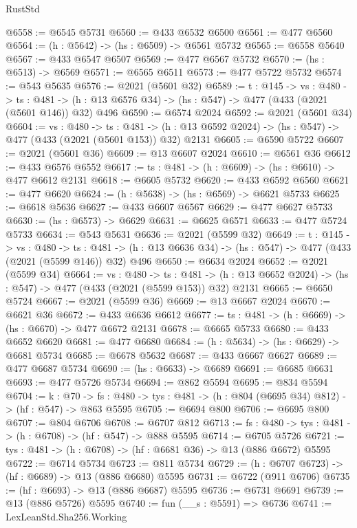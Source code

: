 \begin{lexlean}{RustStd}
\begin{coremodule}
@6558 := @6545 @5731
@6560 := @433 @6532 @6500
@6561 := @477 @6560
@6564 := (h : @5642) -> (hs : @6509) -> @6561 @5732
@6565 := @6558 @5640
@6567 := @433 @6547 @6507
@6569 := @477 @6567 @5732
@6570 := (hs : @6513) -> @6569
@6571 := @6565 @6511
@6573 := @477 @5722 @5732
@6574 := @543 @5635
@6576 := @2021 (@5601 @32)
@6589 := {t : @145} ->
  {vs : @480} ->
  {ts : @481} -> (h : @13 @6576 @34) -> (hs : @547) -> @477 (@433 (@2021 (@5601 @146)) @32) @496
@6590 := @6574 @2024
@6592 := @2021 (@5601 @34)
@6604 := {vs : @480} ->
  {ts : @481} -> (h : @13 @6592 @2024) -> (hs : @547) -> @477 (@433 (@2021 (@5601 @153)) @32) @2131
@6605 := @6590 @5722
@6607 := @2021 (@5601 @36)
@6609 := @13 @6607 @2024
@6610 := @6561 @36
@6612 := @433 @6576 @6552
@6617 := {ts : @481} -> (h : @6609) -> (hs : @6610) -> @477 @6612 @2131
@6618 := @6605 @5732
@6620 := @433 @6592 @6560
@6621 := @477 @6620
@6624 := (h : @5638) -> (hs : @6569) -> @6621 @5733
@6625 := @6618 @5636
@6627 := @433 @6607 @6567
@6629 := @477 @6627 @5733
@6630 := (hs : @6573) -> @6629
@6631 := @6625 @6571
@6633 := @477 @5724 @5733
@6634 := @543 @5631
@6636 := @2021 (@5599 @32)
@6649 := {t : @145} ->
  {vs : @480} ->
  {ts : @481} -> (h : @13 @6636 @34) -> (hs : @547) -> @477 (@433 (@2021 (@5599 @146)) @32) @496
@6650 := @6634 @2024
@6652 := @2021 (@5599 @34)
@6664 := {vs : @480} ->
  {ts : @481} -> (h : @13 @6652 @2024) -> (hs : @547) -> @477 (@433 (@2021 (@5599 @153)) @32) @2131
@6665 := @6650 @5724
@6667 := @2021 (@5599 @36)
@6669 := @13 @6667 @2024
@6670 := @6621 @36
@6672 := @433 @6636 @6612
@6677 := {ts : @481} -> (h : @6669) -> (hs : @6670) -> @477 @6672 @2131
@6678 := @6665 @5733
@6680 := @433 @6652 @6620
@6681 := @477 @6680
@6684 := (h : @5634) -> (hs : @6629) -> @6681 @5734
@6685 := @6678 @5632
@6687 := @433 @6667 @6627
@6689 := @477 @6687 @5734
@6690 := (hs : @6633) -> @6689
@6691 := @6685 @6631
@6693 := @477 @5726 @5734
@6694 := @862 @5594
@6695 := @834 @5594
@6704 := {k : @70} ->
  {fs : @480} -> {tys : @481} -> (h : @804 (@6695 @34) @812) -> (hf : @547) -> @863 @5595
@6705 := @6694 @800
@6706 := @6695 @800
@6707 := @804 @6706
@6708 := @6707 @812
@6713 := {fs : @480} -> {tys : @481} -> (h : @6708) -> (hf : @547) -> @888 @5595
@6714 := @6705 @5726
@6721 := {tys : @481} -> (h : @6708) -> (hf : @6681 @36) -> @13 (@886 @6672) @5595
@6722 := @6714 @5734
@6723 := @811 @5734
@6729 := (h : @6707 @6723) -> (hf : @6689) -> @13 (@886 @6680) @5595
@6731 := @6722 (@911 @6706)
@6735 := (hf : @6693) -> @13 (@886 @6687) @5595
@6736 := @6731 @6691
@6739 := @13 (@886 @5726) @5595
@6740 := fun (__s : @5591) => @6736
@6741 := LexLeanStd.Sha256.Working

\end{coremodule}
\end{lexlean}
